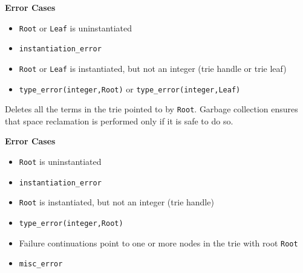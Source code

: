 \begin{description}
{\bf Error Cases}
\begin{itemize}
\item 	{\tt Root} or {\tt Leaf} is uninstantiated
\bi
\item 	 {\tt instantiation\_error}
\ei
\item 	{\tt Root} or {\tt Leaf} is instantiated, but not an integer
  (trie handle or trie leaf) 
\bi
\item 	 {\tt type\_error(integer,Root)} or {\tt type\_error(integer,Leaf)}
\ei
\end{itemize}
Deletes all the terms in the trie pointed to by {\tt Root}.  Garbage
collection ensures that space reclamation is performed only if it is
safe to do so.

{\bf Error Cases}
\begin{itemize}
\item 	{\tt Root} is uninstantiated
\bi
\item 	 {\tt instantiation\_error}
\ei
\item 	{\tt Root} is instantiated, but not an integer (trie handle)
\bi
\item 	 {\tt type\_error(integer,Root)}
\ei
\item 	Failure continuations point to one or more nodes in the trie with root {\tt Root}
\bi
\item 	{\tt misc\_error}
\ei
\end{itemize}

\end{description}

